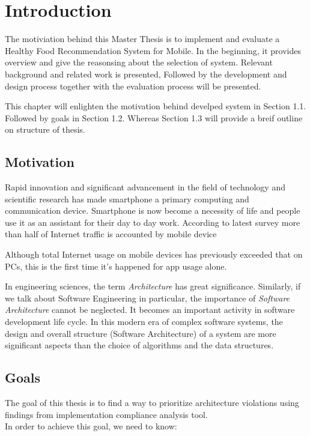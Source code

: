 \chapter{Introduction}
\setcounter{page}{1}%
\thispagestyle{empty}

The motiviation behind this Master Thesis is to implement and evaluate a Healthy Food Recommendation System for Mobile. In the beginning, it provides overview and give the reasonsing about the selection of system. Relevant background and related work is presented, Followed by the development and design process together with the evaluation process will be presented. \newline

This chapter will enlighten the motivation behind develped system in Section 1.1. Followed by goals in Section 1.2. Whereas Section 1.3 will provide a breif outline on structure of thesis.

\section{Motivation}\label{motivation}

Rapid innovation and significant advancement in the field of technology and scientific research has made smartphone a primary computing and communication device. Smartphone is now become a necessity of life and people use it as an assistant for their day to day work. According to latest survey more than half of Internet traffic is accounted by mobile device 

Although total Internet usage on mobile devices has previously exceeded that on PCs, this is the first time it's happened for app usage alone.

In engineering sciences, the term \textit{Architecture} has great significance. Similarly, if we talk about Software Engineering in particular, the importance of \textit{Software Architecture} cannot be neglected. It becomes an important activity in software development life cycle. In this modern era of complex software systems, the design and overall structure (Software Architecture) of a system are more significant aspects than the choice of algorithms and the data structures.\newline

\section{Goals}
The goal of this thesis is to find a way to prioritize architecture violations using findings from implementation compliance analysis tool. \\In order to achieve this goal, we need to know:

